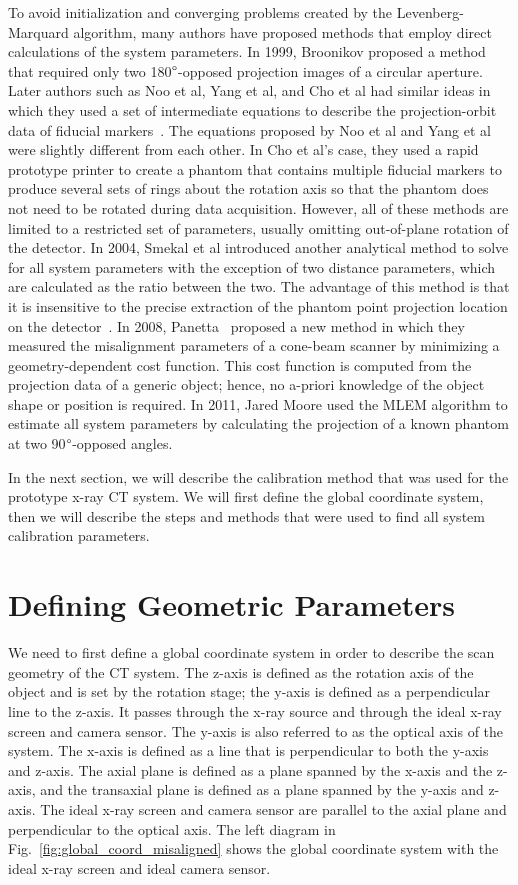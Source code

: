 To avoid initialization and converging problems created by the Levenberg-Marquard algorithm, many authors have proposed methods that employ direct calculations of the system parameters.  In 1999, Broonikov proposed a method that required only two 180$\degree$-opposed projection images of  a circular aperture.  Later authors such as Noo et al, Yang et al, and Cho et al had similar ideas in which they used a set of intermediate equations to describe the projection-orbit data of fiducial markers~\citep{Noo2000, Yang2006, Cho2005}.  The equations proposed by Noo et al and Yang et al were slightly different from each other.  In Cho et al's case, they used a rapid prototype printer to create a phantom that contains multiple fiducial markers to produce several sets of rings about the rotation axis so that the phantom does not need to be rotated during data acquisition.  However, all of these methods are limited to a restricted set of parameters, usually omitting out-of-plane rotation of the detector.  In 2004, Smekal et al introduced another analytical method to solve for all system parameters with the exception of two distance parameters, which are calculated as the ratio between the two.  The advantage of this method is that it is insensitive to the precise extraction of the phantom point projection location on the detector~\citep{Smekal2004}.  In 2008, Panetta~\citep{Panetta2008} proposed a new method in which they measured the misalignment parameters of a cone-beam scanner by minimizing a geometry-dependent cost function.  This cost function is computed from the projection data of a generic object; hence, no a-priori knowledge of the object shape or position is required.  In 2011, Jared Moore used the MLEM algorithm to estimate all system parameters by calculating the projection of a known phantom at two 90$\degree$-opposed angles.

In the next section, we will describe the calibration method that was used for the prototype x-ray CT system.  We will first define the global coordinate system, then we will describe the steps and methods that were used to find all system calibration parameters.

\section{Defining Geometric Parameters}
We need to first define a global coordinate system in order to describe the scan geometry of the CT system.  The z-axis is defined as the rotation axis of the object and is set by the rotation stage; the y-axis is defined as a perpendicular line to the z-axis.  It passes through the x-ray source and through the ideal x-ray screen and camera sensor.  The y-axis is also referred to as the optical axis of the system.  The x-axis is defined as a line that is perpendicular to both the y-axis and z-axis.  The axial plane is defined as a plane spanned by the x-axis and the z-axis, and the transaxial plane is defined as a plane spanned by the y-axis and z-axis.  The ideal x-ray screen and camera sensor are parallel to the axial plane and perpendicular to the optical axis.  The left diagram in Fig.~\ref{fig:global_coord_misaligned} shows the global coordinate system with the ideal x-ray screen and ideal camera sensor.  

